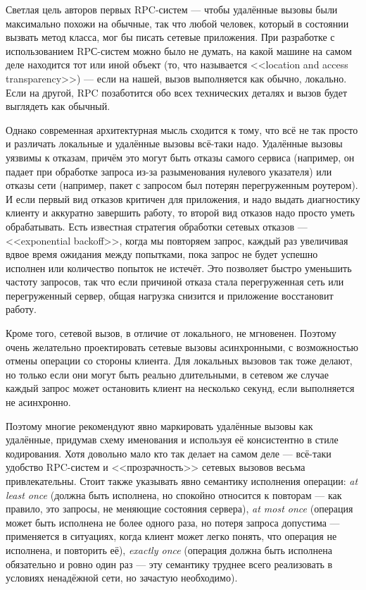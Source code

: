 \documentclass{../../text-style}
\begin{document}
Светлая цель авторов первых RPC-систем --- чтобы удалённые вызовы были максимально похожи на обычные, так что любой человек, который в состоянии вызвать метод класса, мог бы писать сетевые приложения. При разработке с использованием RPС-систем можно было не думать, на какой машине на самом деле находится тот или иной объект (то, что называется <<location and access transparency>>) --- если на нашей, вызов выполняется как обычно, локально. Если на другой, RPC позаботится обо всех технических деталях и вызов будет выглядеть как обычный.

Однако современная архитектурная мысль сходится к тому, что всё не так просто и различать локальные и удалённые вызовы всё-таки надо. Удалённые вызовы уязвимы к отказам, причём это могут быть отказы самого сервиса (например, он падает при обработке запроса из-за разыменования нулевого указателя) или отказы сети (например, пакет с запросом был потерян перегруженным роутером). И если первый вид отказов критичен для приложения, и надо выдать диагностику клиенту и аккуратно завершить работу, то второй вид отказов надо просто уметь обрабатывать. Есть известная стратегия обработки сетевых отказов --- <<exponential backoff>>, когда мы повторяем запрос, каждый раз увеличивая вдвое время ожидания между попытками, пока запрос не будет успешно исполнен или количество попыток не истечёт. Это позволяет быстро уменьшить частоту запросов, так что если причиной отказа стала перегруженная сеть или перегруженный сервер, общая нагрузка снизится и приложение восстановит работу.

Кроме того, сетевой вызов, в отличие от локального, не мгновенен. Поэтому очень желательно проектировать сетевые вызовы асинхронными, с возможностью отмены операции со стороны клиента. Для локальных вызовов так тоже делают, но только если они могут быть реально длительными, в сетевом же случае каждый запрос может остановить клиент на несколько секунд, если выполняется не асинхронно.

Поэтому многие рекомендуют явно маркировать удалённые вызовы как удалённые, придумав схему именования и используя её консистентно в стиле кодирования. Хотя довольно мало кто так делает на самом деле --- всё-таки удобство RPC-систем и <<прозрачность>> сетевых вызовов весьма привлекательны. Стоит также указывать явно семантику исполнения операции: \emph{at least once} (должна быть исполнена, но спокойно относится к повторам --- как правило, это запросы, не меняющие состояния сервера), \emph{at most once} (операция может быть исполнена не более одного раза, но потеря запроса допустима --- применяется в ситуациях, когда клиент может легко понять, что операция не исполнена, и повторить её), \emph{exactly once} (операция должна быть исполнена обязательно и ровно один раз --- эту семантику труднее всего реализовать в условиях ненадёжной сети, но зачастую необходимо).
\end{document}
